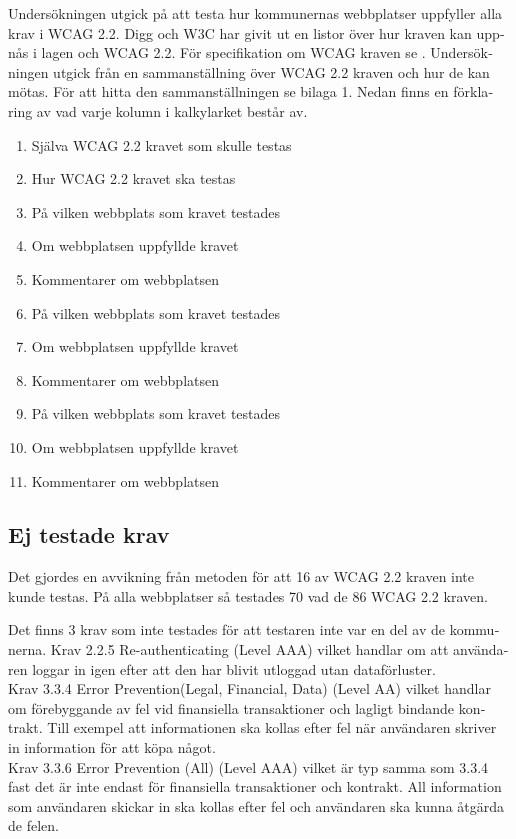 \documentclass[11p]{article}
\begin{document}
\begin{otherlanguage}{swedish}
    Undersökningen utgick på att testa hur kommunernas webbplatser uppfyller alla krav i WCAG 2.2.
    Digg och W3C har givit ut en listor över hur kraven kan uppnås i lagen och WCAG 2.2.
    För specifikation om WCAG kraven se \textcite{WCAG_2.2}.
    Undersökningen utgick från en sammanställning över WCAG 2.2 kraven och hur de kan mötas.
    För att hitta den sammanställningen se bilaga 1.
    Nedan finns en förklaring av vad varje kolumn i kalkylarket består av.
    \begin{enumerate}
        \item Själva WCAG 2.2 kravet som skulle testas
        \item Hur WCAG 2.2 kravet ska testas
        \item På vilken webbplats som kravet testades
        \item Om webbplatsen uppfyllde kravet
        \item Kommentarer om webbplatsen
        \item På vilken webbplats som kravet testades
        \item Om webbplatsen uppfyllde kravet
        \item Kommentarer om webbplatsen
        \item På vilken webbplats som kravet testades
        \item Om webbplatsen uppfyllde kravet
        \item Kommentarer om webbplatsen
    \end{enumerate}

    \subsection{Ej testade krav}

    Det gjordes en avvikning från metoden för att 16 av WCAG 2.2 kraven inte kunde testas.
    På alla webbplatser så testades 70 vad de 86 WCAG 2.2 kraven.

    Det finns 3 krav som inte testades för att testaren inte var en del av de kommunerna.
    Krav 2.2.5 Re-authenticating (Level AAA) vilket handlar om att användaren loggar in igen efter att den har blivit utloggad utan dataförluster.
    \\ Krav 3.3.4 Error Prevention(Legal, Financial, Data) (Level AA) vilket handlar om förebyggande av fel vid finansiella transaktioner och lagligt bindande kontrakt.
    Till exempel att informationen ska kollas efter fel när användaren skriver in information för att köpa något.
    \\  Krav 3.3.6 Error Prevention (All) (Level AAA) vilket är typ samma som 3.3.4 fast det är inte endast för finansiella transaktioner och kontrakt.
    All information som användaren skickar in ska kollas efter fel och användaren ska kunna åtgärda de felen.


\end{otherlanguage}
\end{document}
